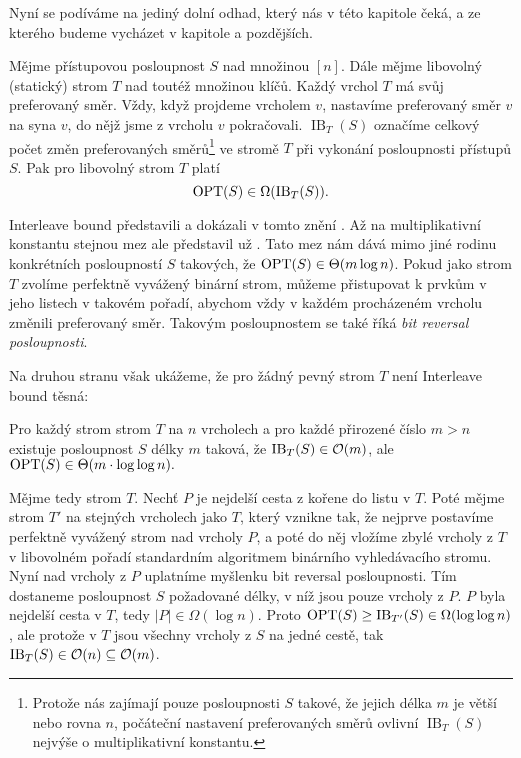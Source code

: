 Nyní se podíváme na jediný dolní odhad, který nás v této kapitole čeká, a ze kterého budeme vycházet v kapitole  a pozdějších.

\def\ib{\operatorname{IB}}

\begin{veta}
Mějme přístupovou posloupnost $S$ nad množinou $[n]$. Dále mějme libovolný (statický) strom $T$ nad toutéž množinou klíčů. Každý vrchol $T$ má svůj preferovaný směr. Vždy, když projdeme vrcholem $v$, nastavíme preferovaný směr $v$ na syna $v$, do nějž jsme z vrcholu $v$ pokračovali. $\ib_T(S)$ označíme celkový počet změn preferovaných směrů\footnote{Protože nás zajímají pouze posloupnosti $S$ takové, že jejich délka $m$ je větší nebo rovna $n$, počáteční nastavení preferovaných směrů ovlivní $\ib_T(S)$ nejvýše o multiplikativní konstantu.} ve stromě $T$ při vykonání posloupnosti přístupů $S$. Pak pro libovolný strom $T$ platí $$\opt(S) \in \Omega(\ib_T(S)).$$
\end{veta}

Interleave bound představili a dokázali v tomto znění \citet{tango}. Až na
multiplikativní konstantu stejnou mez ale představil už \citet{interleave}.
Tato mez nám dává mimo jiné rodinu konkrétních posloupností $S$ takových, že
$\operatorname{OPT}(S)\in\Theta(m\log n)$. Pokud jako strom $T$ zvolíme perfektně vyvážený
binární strom, můžeme přistupovat k prvkům v jeho listech v takovém pořadí,
abychom vždy v každém procházeném vrcholu změnili preferovaný směr. Takovým
posloupnostem se také říká \emph{bit reversal posloupnosti}.

Na druhou stranu však ukážeme, že pro žádný pevný strom $T$ není Interleave bound těsná:
\begin{tvrz}
Pro každý strom strom $T$ na $n$ vrcholech a pro každé přirozené číslo $m>n$ existuje posloupnost $S$ délky $m$ taková, že $\ib_T(S) \in \o(m)$, ale $\operatorname{OPT}(S) \in \Theta(m\cdot\log\log n).$ 
\end{tvrz}

\begin{dukaz}
Mějme tedy strom $T$. Nechť $P$ je nejdelší cesta z kořene do listu v $T$. Poté mějme strom $T'$ na stejných vrcholech jako $T$, který vznikne tak, že nejprve postavíme perfektně vyvážený strom nad vrcholy $P$, a poté do něj vložíme zbylé vrcholy z $T$ v libovolném pořadí standardním algoritmem binárního vyhledávacího stromu. Nyní nad vrcholy z $P$ uplatníme myšlenku bit reversal posloupnosti. Tím dostaneme posloupnost $S$ požadované délky, v níž jsou pouze vrcholy z $P$. $P$ byla nejdelší cesta v $T$, tedy $|P|\in \Omega(\log n)$. Proto $\opt(S)\geq \ib_{T'}(S) \in \Omega (\log\log n)$, ale protože v $T$ jsou všechny vrcholy z $S$ na jedné cestě, tak $\ib_T(S) \in \o(n) \subseteq \o(m)$. 
\end{dukaz}

